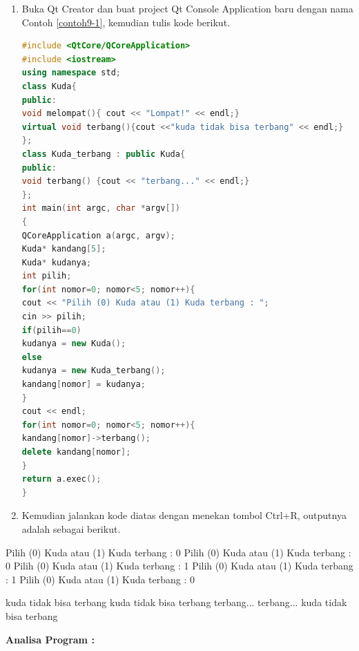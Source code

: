 \begin{enumerate}

\item
  Buka Qt Creator dan buat project Qt Console Application baru dengan
  nama Contoh \ref{contoh9-1}, kemudian tulis kode berikut.

\begin{lstlisting}[language=c++, caption= Meletakkan metode kelas turunan di kelas dasar, label=contoh9-1]
#include <QtCore/QCoreApplication>
#include <iostream>
using namespace std;
class Kuda{
public:
void melompat(){ cout << "Lompat!" << endl;}
virtual void terbang(){cout <<"kuda tidak bisa terbang" << endl;}
};
class Kuda_terbang : public Kuda{
public:
void terbang() {cout << "terbang..." << endl;}
};
int main(int argc, char *argv[])
{
QCoreApplication a(argc, argv);
Kuda* kandang[5];
Kuda* kudanya;
int pilih;
for(int nomor=0; nomor<5; nomor++){
cout << "Pilih (0) Kuda atau (1) Kuda terbang : ";
cin >> pilih;
if(pilih==0)
kudanya = new Kuda();
else
kudanya = new Kuda_terbang();
kandang[nomor] = kudanya;
}
cout << endl;
for(int nomor=0; nomor<5; nomor++){
kandang[nomor]->terbang();
delete kandang[nomor];
}
return a.exec();
}
\end{lstlisting}
\item
  Kemudian jalankan kode diatas dengan menekan tombol Ctrl+R, outputnya
  adalah sebagai berikut.
\end{enumerate}

\begin{lcverbatim}
Pilih (0) Kuda atau (1) Kuda terbang : 0
Pilih (0) Kuda atau (1) Kuda terbang : 0
Pilih (0) Kuda atau (1) Kuda terbang : 1
Pilih (0) Kuda atau (1) Kuda terbang : 1
Pilih (0) Kuda atau (1) Kuda terbang : 0

kuda tidak bisa terbang
kuda tidak bisa terbang
terbang...
terbang...
kuda tidak bisa terbang
\end{lcverbatim}

\textbf{Analisa Program :}

